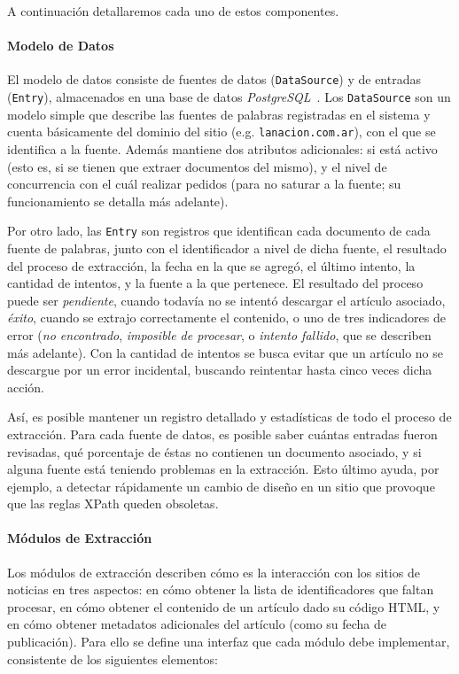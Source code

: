 A continuación detallaremos cada uno de estos componentes.


\paragraph{Modelo de Datos}

El modelo de datos consiste de fuentes de datos (\texttt{DataSource}) y de entradas
(\texttt{Entry}), almacenados en una base de datos \textit{PostgreSQL}~\cite{PostgreSQL}. Los
\texttt{DataSource} son un modelo simple que describe las fuentes de palabras registradas en el
sistema y cuenta básicamente del dominio del sitio (e.g. \texttt{lanacion.com.ar}), con el que se
identifica a la fuente. Además mantiene dos atributos adicionales: si está activo (esto es, si se
tienen que extraer documentos del mismo), y el nivel de concurrencia con el cuál realizar pedidos
(para no saturar a la fuente; su funcionamiento se detalla más adelante).

Por otro lado, las \texttt{Entry} son registros que identifican cada documento de cada fuente de
palabras, junto con el identificador a nivel de dicha fuente, el resultado del proceso de
extracción, la fecha en la que se agregó, el último intento, la cantidad de intentos, y la fuente a
la que pertenece. El resultado del proceso puede ser \textit{pendiente}, cuando todavía no se
intentó descargar el artículo asociado, \textit{éxito}, cuando se extrajo correctamente el
contenido, o uno de tres indicadores de error (\textit{no encontrado}, \textit{imposible de
procesar}, o \textit{intento fallido}, que se describen más adelante). Con la cantidad de intentos
se busca evitar que un artículo no se descargue por un error incidental, buscando reintentar hasta
cinco veces dicha acción.

Así, es posible mantener un registro detallado y estadísticas de todo el proceso de extracción. Para
cada fuente de datos, es posible saber cuántas entradas fueron revisadas, qué porcentaje de éstas no
contienen un documento asociado, y si alguna fuente está teniendo problemas en la extracción. Esto
último ayuda, por ejemplo, a detectar rápidamente un cambio de diseño en un sitio que provoque que
las reglas XPath queden obsoletas.


\paragraph{Módulos de Extracción}

Los módulos de extracción describen cómo es la interacción con los sitios de noticias en tres
aspectos: en cómo obtener la lista de identificadores que faltan procesar, en cómo obtener el
contenido de un artículo dado su código HTML, y en cómo obtener metadatos adicionales del artículo
(como su fecha de publicación). Para ello se define una interfaz que cada módulo debe implementar,
consistente de los siguientes elementos:

